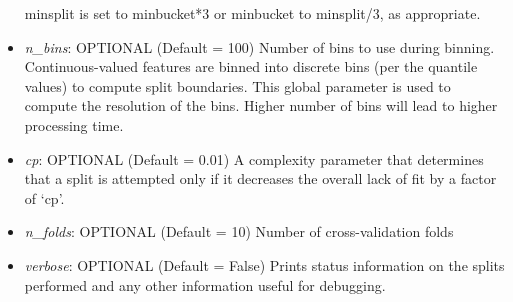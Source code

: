 \begin{itemize}
    minsplit is set to minbucket*3 or minbucket to minsplit/3, as appropriate.
    \item \emph{n\_bins}: OPTIONAL (Default = 100) Number of bins to use during binning.
    Continuous-valued features are binned into discrete bins (per the quantile values)
    to compute split boundaries. This global parameter is used to compute the resolution of the bins. Higher number of bins will lead to higher processing time.
    \item \emph{cp}: OPTIONAL (Default = 0.01)
        A complexity parameter that determines that a split is attempted only if it
        decreases the overall lack of fit by a factor of `cp'.
    \item \emph{n\_folds}: OPTIONAL (Default = 10) Number of cross-validation folds
    \item \emph{verbose}: OPTIONAL (Default = False) Prints status information
     on the splits performed and any other information useful for debugging.
\end{itemize}

